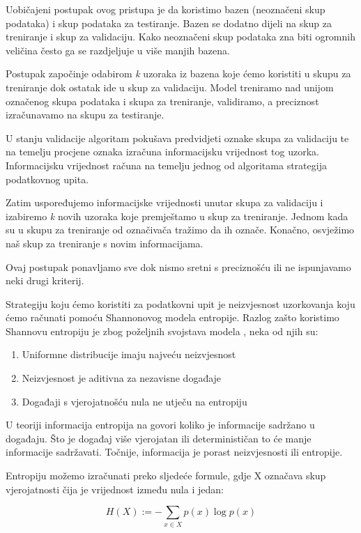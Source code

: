 \documentclass[times, utf8, zavrsni, numeric]{fer}
\begin{document}
Uobičajeni postupak ovog pristupa je da koristimo bazen (neoznačeni skup podataka) i skup podataka za testiranje. Bazen se dodatno dijeli na skup za treniranje i skup za validaciju. 
Kako neoznačeni skup podataka zna biti ogromnih veličina često ga se razdjeljuje u više manjih bazena.

Postupak započinje odabirom \textit{k} uzoraka iz bazena koje ćemo koristiti u skupu za treniranje dok ostatak ide u skup za validaciju. Model treniramo nad unijom označenog skupa podataka i skupa za treniranje, validiramo, a preciznost izračunavamo na skupu za testiranje.

U stanju validacije algoritam pokušava predvidjeti oznake skupa za validaciju te na temelju procjene oznaka izračuna informacijsku vrijednost tog uzorka. Informacijsku vrijednost računa na temelju jednog od algoritama strategija podatkovnog upita.

Zatim uspoređujemo informacijske vrijednosti unutar skupa za validaciju i izabiremo \textit{k} novih uzoraka koje premještamo u skup za treniranje. Jednom kada su u skupu za treniranje od označivača tražimo da ih označe. Konačno, osvježimo naš skup za treniranje s novim informacijama. 

Ovaj postupak ponavljamo sve dok nismo sretni s preciznošću ili ne ispunjavamo neki drugi kriterij.

Strategiju koju ćemo koristiti za podatkovni upit je neizvjesnost uzorkovanja koju ćemo računati pomoću Shannonovog modela entropije. Razlog zašto koristimo Shannovu entropiju je zbog poželjnih svojstava modela \citep{namdari2019review}, neka od njih su: 

\begin{enumerate}
    \item Uniformne distribucije imaju najveću neizvjesnost
    \item Neizvjesnost je aditivna za nezavisne događaje
    \item Događaji s vjerojatnošću nula ne utječu na entropiju
\end{enumerate}

U teoriji informacija entropija na govori koliko je informacije sadržano u događaju. Što je događaj više vjerojatan ili determinističan to će manje informacije sadržavati. Točnije, informacija je porast neizvjesnosti ili entropije.

Entropiju možemo izračunati preko sljedeće formule, gdje X označava skup vjerojatnosti čija je vrijednost između nula i jedan:

\begin{equation}
H(X) := -\sum_{x\in X}p(x)\log{p(x)}
\end{equation}
\end{document}
